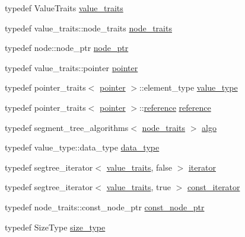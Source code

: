 \begin{DoxyCompactItemize}
\item 
typedef Value\+Traits \hyperlink{classboost_1_1intrusive_1_1segment__tree__impl_a929c1b3f1e6bb851a911b9b54a4c0dc2}{value\+\_\+traits}
\item 
typedef value\+\_\+traits\+::node\+\_\+traits \hyperlink{classboost_1_1intrusive_1_1segment__tree__impl_a4530e7ef515902af7c906bbe0c6bb5f2}{node\+\_\+traits}
\item 
typedef node\+::node\+\_\+ptr \hyperlink{classboost_1_1intrusive_1_1segment__tree__impl_a3fcf2b7f82b582e4dcf22eca8914f664}{node\+\_\+ptr}
\item 
typedef value\+\_\+traits\+::pointer \hyperlink{classboost_1_1intrusive_1_1segment__tree__impl_a4345924066a33f309182d027249887ab}{pointer}
\item 
typedef pointer\+\_\+traits$<$ \hyperlink{classboost_1_1intrusive_1_1segment__tree__impl_a4345924066a33f309182d027249887ab}{pointer} $>$\+::element\+\_\+type \hyperlink{classboost_1_1intrusive_1_1segment__tree__impl_ab1fd253eacbcdbacb8e5e73fc580626d}{value\+\_\+type}
\item 
typedef pointer\+\_\+traits$<$ \hyperlink{classboost_1_1intrusive_1_1segment__tree__impl_a4345924066a33f309182d027249887ab}{pointer} $>$\+::\hyperlink{classboost_1_1intrusive_1_1segment__tree__impl_a62cd48d63afd795ad2c6f979266abe94}{reference} \hyperlink{classboost_1_1intrusive_1_1segment__tree__impl_a62cd48d63afd795ad2c6f979266abe94}{reference}
\item 
typedef segment\+\_\+tree\+\_\+algorithms$<$ \hyperlink{classboost_1_1intrusive_1_1segment__tree__impl_a4530e7ef515902af7c906bbe0c6bb5f2}{node\+\_\+traits} $>$ \hyperlink{classboost_1_1intrusive_1_1segment__tree__impl_a826a6c90baa684755f5035b74683e762}{algo}
\item 
typedef value\+\_\+type\+::data\+\_\+type \hyperlink{classboost_1_1intrusive_1_1segment__tree__impl_a92c83c631da1bcdaa004756ea98b2ec5}{data\+\_\+type}
\item 
typedef segtree\+\_\+iterator$<$ \hyperlink{classboost_1_1intrusive_1_1segment__tree__impl_a929c1b3f1e6bb851a911b9b54a4c0dc2}{value\+\_\+traits}, false $>$ \hyperlink{classboost_1_1intrusive_1_1segment__tree__impl_a9f1be9b01be5078fb59b2e34520b374a}{iterator}
\item 
typedef segtree\+\_\+iterator$<$ \hyperlink{classboost_1_1intrusive_1_1segment__tree__impl_a929c1b3f1e6bb851a911b9b54a4c0dc2}{value\+\_\+traits}, true $>$ \hyperlink{classboost_1_1intrusive_1_1segment__tree__impl_a6957e501101f1d5427f611f6ee8d1ded}{const\+\_\+iterator}
\item 
typedef node\+\_\+traits\+::const\+\_\+node\+\_\+ptr \hyperlink{classboost_1_1intrusive_1_1segment__tree__impl_aa0f2dc05aa707192c6daa27f509642ed}{const\+\_\+node\+\_\+ptr}
\item 
typedef Size\+Type \hyperlink{classboost_1_1intrusive_1_1segment__tree__impl_ad11efa20e1eb479bc39e13ea312ca088}{size\+\_\+type}
\end{DoxyCompactItemize}

